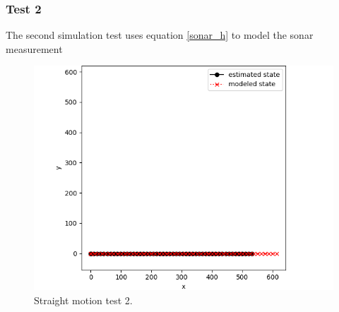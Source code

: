 \subsubsection{Test 2}

The second simulation test uses equation \ref{sonar_h} to model the sonar measurement

\begin{figure}[!htb]
	\begin{center}
		\includegraphics[scale=0.480]{imgs/ekf_straight_motion_2.png}
	\end{center}
	\caption{ Straight motion test 2.}
	\label{ekf_straight_motion_2}
\end{figure}
 